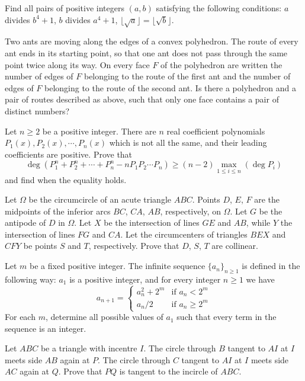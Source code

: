\documentclass[11pt]{scrartcl}
\begin{document}
\begin{problem}[600298381529685]
	Find all pairs of positive integers $(a,b)$ satisfying the following conditions:
$a$ divides $b^4+1$,
$b$ divides $a^4+1$,
$\lfloor\sqrt{a}\rfloor=\lfloor \sqrt{b}\rfloor$.
\end{problem}
\begin{problem}[602995508900984]
Two ants are moving along the edges of a convex polyhedron. The route of every ant ends in its starting point, so that one ant does not pass through the same point twice along its way. On every face $F$ of the polyhedron are written the number of edges of $F$ belonging to the route of the first ant and the number of edges of $F$ belonging to the route of the second ant. Is there a polyhedron and a pair of routes described as above, such that only one face contains a pair of distinct numbers?
\end{problem}
\begin{problem}[604188725177670]
	Let $n\ge 2$ be a positive integer. There are $n$ real coefficient polynomials $P_1(x),P_2(x),\cdots ,P_n(x)$ which is not all the same, and their leading coefficients are positive. Prove that
$$\deg(P_1^n+P_2^n+\cdots +P_n^n-nP_1P_2\cdots P_n)\ge (n-2)\max_{1\le i\le n}(\deg P_i)$$and find when the equality holds.
\end{problem}
\begin{problem}[607556370102952]
Let $\Omega$ be the circumcircle of an acute triangle $ABC$. Points $D$, $E$, $F$ are the midpoints of the inferior arcs $BC$, $CA$, $AB$, respectively, on $\Omega$. Let $G$ be the antipode of $D$ in $\Omega$. Let $X$ be the intersection of lines $GE$ and $AB$, while $Y$ the intersection of lines $FG$ and $CA$. Let the circumcenters of triangles $BEX$ and $CFY$ be points $S$ and $T$, respectively. Prove that $D$, $S$, $T$ are collinear.
\end{problem}
\begin{problem}[613109155420064]
Let $m$ be a fixed positive integer. The infinite sequence $\{a_n\}_{n\geq 1}$ is defined in the following way: $a_1$ is a positive integer, and for every integer $n\geq 1$ we have
$$a_{n+1} = \begin{cases}a_n^2+2^m & \text{if } a_n< 2^m \\ a_n/2 &\text{if } a_n\geq 2^m\end{cases}$$For each $m$, determine all possible values of $a_1$ such that every term in the sequence is an integer.
\end{problem}
\begin{problem}[613302970238472]
	Let $ABC$ be a triangle with incentre $I$. The circle through $B$ tangent to $AI$ at $I$ meets side $AB$ again at $P$. The circle through $C$ tangent to $AI$ at $I$ meets side $AC$ again at $Q$. Prove that $PQ$ is tangent to the incircle of $ABC.$
\end{problem}
\end{document}
